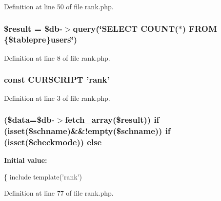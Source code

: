 Definition at line 50 of file rank.\+php.

\hypertarget{rank_8php_a112ef069ddc0454086e3d1e6d8d55d07}{
\subsubsection[{\$result}]{\setlength{\rightskip}{0pt plus 5cm}\${\bf result} = \$db-\/$>$query(\char`\"{}S\+E\+L\+E\+C\+T C\+O\+U\+N\+T($\ast$) F\+R\+O\+M \{\$tablepre\}users\char`\"{})}}\label{rank_8php_a112ef069ddc0454086e3d1e6d8d55d07}


Definition at line 8 of file rank.\+php.

\hypertarget{rank_8php_a39c39f525eceb86cabc338804f230e80}{
\subsubsection[{C\+U\+R\+S\+C\+R\+I\+P\+T}]{\setlength{\rightskip}{0pt plus 5cm}const C\+U\+R\+S\+C\+R\+I\+P\+T 'rank'}}\label{rank_8php_a39c39f525eceb86cabc338804f230e80}


Definition at line 3 of file rank.\+php.

\hypertarget{rank_8php_a7bd00ad9e52e5687a0fc1335557e5670}{
\subsubsection[{else}]{ (\$data=\$db-\/$>$fetch\+\_\+array(\${\bf result})) {\bf if} (isset(\${\bf schname})\&\&!empty(\${\bf schname})) {\bf if} (isset(\$checkmode)) else}}\label{rank_8php_a7bd00ad9e52e5687a0fc1335557e5670}
{\bfseries Initial value\+:}
\begin{DoxyCode}
\{
    include \textcolor{keyword}{template}(\textcolor{stringliteral}{'rank'})
\end{DoxyCode}


Definition at line 77 of file rank.\+php.

